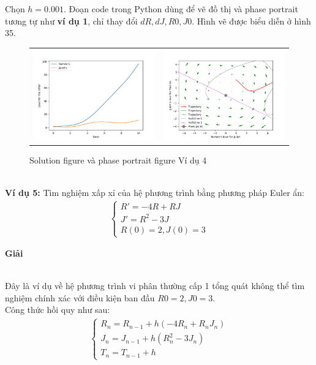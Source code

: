 Chọn $h=0.001$. Đoạn code trong Python dùng để vẽ đồ thị và phase portrait tương tự như \textbf{ví dụ 1}, chỉ thay đổi $dR, dJ, R0, J0$. Hình vẽ được biểu diễn ở hình 35.
\begin{figure}[h!]
    \begin{center}
        \begin{tabular}{cc}
             \includegraphics[width=7cm]{images/euler_4.png} &
             \includegraphics[width=7cm]{images/euler_4_portrait.png}\\
        \end{tabular}
        \caption{Solution figure và phase portrait figure Ví dụ 4}
    \end{center}
\end{figure}\\
\textbf{Ví dụ 5:}  Tìm nghiệm xấp xỉ của hệ phương trình bằng phương pháp Euler ẩn:
\begin{align*}
    \begin{cases}
        R'=-4R + RJ\\
        J'=R^2 - 3J\\
        R(0)=2, J(0)=3
    \end{cases}
\end{align*}
\centerline{\textbf{Giải}}\\
Đây là ví dụ về hệ phương trình vi phân thường cấp 1 tổng quát không thể tìm nghiệm chính xác với điều kiện ban đầu $R0 = 2, J0 = 3$.\\
Công thức hồi quy như sau:
\begin{align*}
    \begin{cases}
        R_n=R_{n-1}+h(-4R_n + R_nJ_n)\\
        J_n=J_{n-1}+h(R_n^2 - 3J_n)\\
        T_n=T_{n-1}+h
    \end{cases}
\end{align*}
